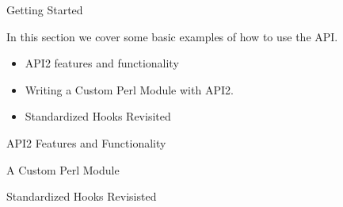 \begin{section}{Getting Started}
  
  In this section we cover some basic examples of how to use the \cPanel API.

  \begin{itemize}
  \item API2 features and functionality
  \item Writing a Custom Perl Module with API2.
  \item Standardized Hooks Revisited
  \end{itemize}

\end{section}

\begin{section}{API2 Features and Functionality}
 
  
\end{section}


\begin{section}{A Custom Perl Module}








  
\end{section}


\begin{section}{Standardized Hooks Revisisted}

  
\end{section}
